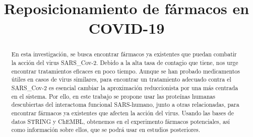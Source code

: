 \documentclass{bmcart}
\begin{document}
	\begin{frontmatter}
	
		\begin{fmbox}
			
			
			\title{Reposicionamiento de fármacos en COVID-19}
			
			
			\author[
			  addressref={aff1},                  
			  email={iresanjim@uma.es}
			]{ }
			\author[
			  addressref={aff1},
			  corref={aff1},
			  email={clarajimenez@uma.es}
			]{ }
			\author[
			  addressref={aff1},
			  email={patriciatr99@uma.es}
			]{ }
			\author[
			  addressref={aff1},
			  email={\texttt{luci\_vm@uma.es}}
			]{ }
			
			
			\address[id=aff1]{%
			  ,             %
			  ,          %
			  ,                              %
			}
		
		\end{fmbox}%
		
		\begin{abstractbox}
		
			\begin{abstract} %
			En esta investigación, se busca encontrar fármacos ya existentes que puedan combatir la acción del virus SARS\_Cov-2. Debido a la alta tasa de contagio que tiene, nos urge encontrar tratamientos eficaces en poco tiempo. Aunque se han probado medicamentos útiles en casos de virus similares, para encontrar un tratamiento adecuado contra el SARS\_Cov-2 es esencial cambiar la aproximación reduccionista por una más centrada en el sistema. 
			Por ello, en este trabajo se propone usar las proteínas humanas descubiertas del interactoma funcional SARS-humano, junto a otras relacionadas, para encontrar fármacos ya existentes que afecten la acción del virus. Usando las bases de datos STRING y ChEMBL, obtenemos en el experimento fármacos potenciales, así como información sobre ellos, que se podrá usar en estudios posteriores.


\end{abstract}
\end{abstractbox}
\end{frontmatter}
\end{document}
